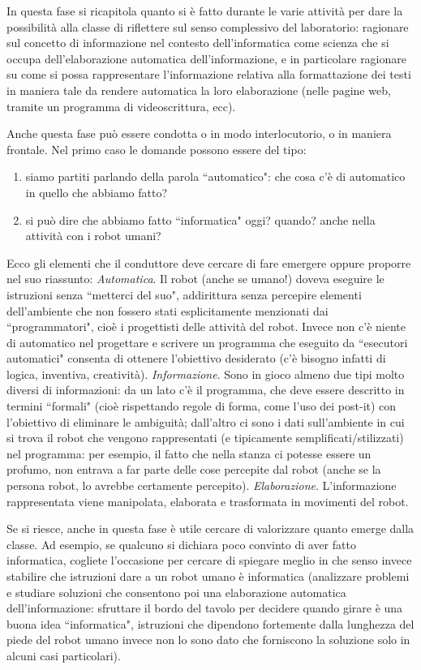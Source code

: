\documentclass[12pt]{article}
\begin{document}
In questa fase si ricapitola quanto si è fatto durante le varie attività per dare la possibilità alla classe di riﬂettere sul senso complessivo del laboratorio: ragionare sul concetto di informazione nel contesto dell’informatica come scienza che si occupa dell’elaborazione automatica dell’informazione, e in particolare ragionare su come si possa rappresentare l’informazione relativa alla formattazione dei testi in maniera tale da rendere automatica la loro elaborazione (nelle pagine web, tramite un programma di videoscrittura, ecc).

Anche questa fase può essere condotta o in modo interlocutorio, o in maniera frontale. Nel primo caso le domande possono essere del tipo:
\begin{enumerate}
\item siamo partiti parlando della parola ``automatico": che cosa c’è di automatico in quello che abbiamo fatto?
\item si può dire che abbiamo fatto ``informatica" oggi? quando? anche nella attività con i robot umani?
\end{enumerate}

Ecco gli elementi che il conduttore deve cercare di fare emergere oppure proporre nel suo riassunto:
\textit{Automatica}. Il robot (anche se umano!) doveva eseguire le istruzioni senza ``metterci del suo", addirittura senza percepire elementi dell’ambiente che non fossero stati esplicitamente menzionati dai ``programmatori", cioè i progettisti delle attività del robot. Invece non c'è niente di automatico nel progettare e scrivere un programma che eseguito da ``esecutori automatici" consenta di ottenere l’obiettivo desiderato (c'è bisogno infatti di logica, inventiva, creatività).
\textit{Informazione}. Sono in gioco almeno due tipi molto diversi di informazioni: da un lato c'è il programma, che deve essere descritto in termini ``formali" (cioè rispettando regole di forma, come l’uso dei post-it) con l'obiettivo di eliminare le ambiguità; dall’altro ci sono i dati sull’ambiente in cui si trova il robot che vengono rappresentati (e tipicamente sempliﬁcati/stilizzati) nel programma: per esempio, il fatto che nella stanza ci potesse essere un profumo, non entrava a far parte delle cose percepite dal robot (anche se la persona robot, lo avrebbe certamente percepito).
\textit{Elaborazione}. L’informazione rappresentata viene manipolata, elaborata e trasformata in movimenti del robot.

Se si riesce, anche in questa fase è utile cercare di valorizzare quanto emerge dalla classe. Ad esempio, se qualcuno si dichiara poco convinto di aver fatto informatica, cogliete l’occasione per cercare di spiegare meglio in che senso invece stabilire che istruzioni dare a un robot umano è informatica (analizzare problemi e studiare soluzioni che consentono poi una elaborazione automatica dell’informazione: sfruttare il bordo del tavolo per decidere quando girare è una buona idea ``informatica", istruzioni che dipendono fortemente dalla lunghezza del piede del robot umano invece non lo sono dato che forniscono la soluzione solo in alcuni casi particolari).
\end{document}
